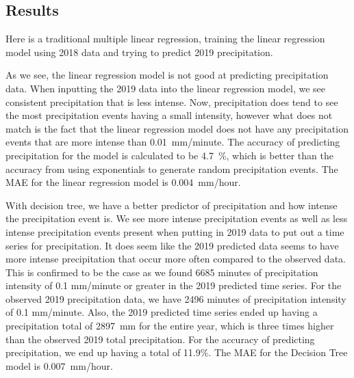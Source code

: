 \documentclass[11pt]{report}
\begin{document}

\subsection{Results}

Here is a traditional multiple linear regression, training the linear
regression model using 2018 data and trying to predict 2019 precipitation.

As we see, the linear regression model is not good at predicting precipitation data. When inputting the 2019 data into the linear regression model, we see consistent precipitation that is less intense. Now, precipitation does tend to see the most precipitation events having a small intensity, however what does not match is the fact that the linear regression model does not have any precipitation events that are more intense than 0.01~mm/minute. The accuracy of predicting precipitation for the model is calculated to be 4.7~\%, which is better than the accuracy from using exponentials to generate random precipitation events. The MAE for the linear regression model is 0.004~mm/hour.


With decision tree, we have a better predictor of precipitation and how intense the precipitation event is. We see more intense precipitation events as well as less intense precipitation events present when putting in 2019 data to put out a time series for precipitation. It does seem like the 2019 predicted data seems to have more intense precipitation that occur more often compared to the observed data. This is confirmed to be the case as we found 6685 minutes of precipitation intensity of 0.1 mm/minute or greater in the 2019 predicted time series. For the observed 2019 precipitation data, we have 2496 minutes of precipitation intensity of 0.1 mm/minute. Also, the 2019 predicted time series ended up having a precipitation total of 2897~mm for the entire year, which is three times higher than the observed 2019 total precipitation. For the accuracy of predicting precipitation, we end up having a total of 11.9\%. The MAE for the Decision Tree model is 0.007~mm/hour.
\end{document}
